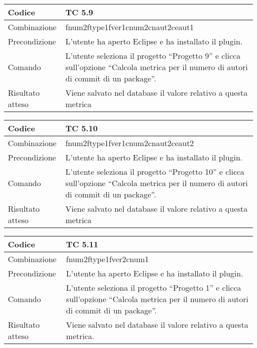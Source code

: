 \begin{table}[ht]
\begin{tabular}{|p{3cm}|p{9cm}|}
\hline
\cellcolor{lightgray}Codice				& TC 5.9								\\
\hline
\cellcolor{lightgray}Combinazione		& fnum2ftype1fver1cnum2cnaut2ceaut1 									\\
\hline
\cellcolor{lightgray}Precondizione		& L'utente ha aperto Eclipse e ha installato il plugin.								\\
\hline
\cellcolor{lightgray}Comando			& L'utente seleziona il progetto ``Progetto 9''  e clicca sull'opzione ``Calcola metrica per il numero di autori di commit di un package''.	\\
\hline
\cellcolor{lightgray}Risultato atteso	& Viene salvato nel database il valore relativo a questa metrica	\\
\hline
\end{tabular}
\end{table}

\begin{table}[ht]
\begin{tabular}{|p{3cm}|p{9cm}|}
\hline
\cellcolor{lightgray}Codice				& TC 5.10								\\
\hline
\cellcolor{lightgray}Combinazione		& fnum2ftype1fver1cnum2cnaut2ceaut2 									\\
\hline
\cellcolor{lightgray}Precondizione		& L'utente ha aperto Eclipse e ha installato il plugin.									\\
\hline
\cellcolor{lightgray}Comando			& L'utente seleziona il progetto ``Progetto 10''  e clicca sull'opzione ``Calcola metrica per il numero di autori di commit di un package''.	\\
\hline
\cellcolor{lightgray}Risultato atteso	& Viene salvato nel database il valore relativo a questa metrica	\\
\hline
\end{tabular}
\end{table}

\begin{table}[ht]
\begin{tabular}{|p{3cm}|p{9cm}|}
\hline
\cellcolor{lightgray}Codice				& TC 5.11								\\
\hline
\cellcolor{lightgray}Combinazione		& fnum2ftype1fver2cnum1									\\
\hline
\cellcolor{lightgray}Precondizione		& L'utente ha aperto Eclipse e ha installato il plugin.		\\
\hline
\cellcolor{lightgray}Comando			& L'utente seleziona il progetto ``Progetto 1''  e clicca sull'opzione ``Calcola metrica per il numero di autori di commit di un package''.	\\
\hline
\cellcolor{lightgray}Risultato atteso	& Viene salvato nel database il valore relativo a questa metrica.\\
\hline
\end{tabular}
\end{table}

